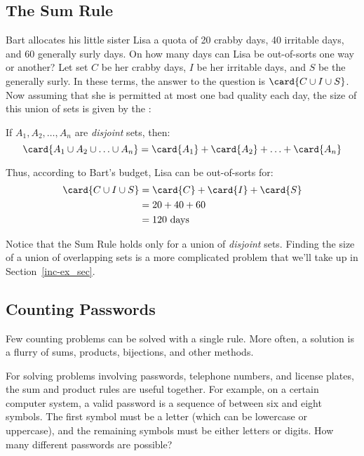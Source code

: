 \iffalse
This means that the number of subsets of an $n$-element set $X$ is
also $2^n$.  We'll put this answer to use shortly.
\fi

\subsection{The Sum Rule}

Bart allocates his little sister Lisa a quota of 20 crabby days, 40
irritable days, and 60 generally surly days.  On how many days can
Lisa be out-of-sorts one way or another?  Let set $C$ be her crabby
days, $I$ be her irritable days, and $S$ be the generally surly.  In
these terms, the answer to the question is $\card{C \cup I \cup S}$.
Now assuming that she is permitted at most one bad quality each day,
the size of this union of sets is given by the :

\begin{rul}\label{rul:sum}
If $A_1, A_2, \ldots, A_n$ are \emph{disjoint} sets, then:
%
\[
\card{A_1 \cup A_2 \cup \ldots \cup A_n}
    = \card{A_1} + \card{A_2} + \ldots + \card{A_n}
\]
\end{rul}

Thus, according to Bart's budget, Lisa can be out-of-sorts for:
%
\begin{align*}
\card{C \cup I \cup S}
    & = \card{C} + \card{I} + \card{S} \\
    & = 20 + 40 + 60 \\
    & = 120 \text{ days}
\end{align*}

Notice that the Sum Rule holds only for a union of \emph{disjoint}
sets.  Finding the size of a union of overlapping sets is a more
complicated problem that we'll take up in Section~\ref{inc-ex_sec}.

\subsection{Counting Passwords}

Few counting problems can be solved with a single rule.  More often, a
solution is a flurry of sums, products, bijections, and other methods.

For solving problems involving passwords, telephone numbers, and
license plates, the sum and product rules are useful together.  For
example, on a certain computer system, a valid password is a sequence
of between six and eight symbols.  The first symbol must be a letter
(which can be lowercase or uppercase), and the remaining symbols must
be either letters or digits.  How many different passwords are
possible?

